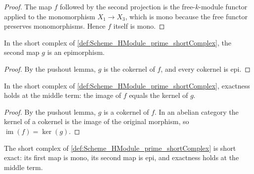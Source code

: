 \begin{proof}

  \leanok
  The map \(f\) followed by the second projection is the free-\(k\)-module functor applied to the monomorphism \(X_1 \to X_3\), which is mono because the free functor preserves monomorphisms. Hence \(f\) itself is mono.
\end{proof}

\begin{lemma}\leanok
  \label{lem:Scheme_HModule_prime_shortComplex_g_epi}

  In the short complex of \cref{def:Scheme_HModule_prime_shortComplex}, the second map \(g\) is an epimorphism.
\end{lemma}

\begin{proof}

  \leanok
  By the pushout lemma, \(g\) is the cokernel of \(f\), and every cokernel is epi.
\end{proof}

\begin{lemma}\leanok
  \label{lem:Scheme_HModule_prime_shortComplex_exact}

  In the short complex of \cref{def:Scheme_HModule_prime_shortComplex}, exactness holds at the middle term: the image of \(f\) equals the kernel of \(g\).
\end{lemma}

\begin{proof}

  \leanok
  By the pushout lemma, \(g\) is a cokernel of \(f\). In an abelian category the kernel of a cokernel is the image of the original morphism, so \(\operatorname{im}(f)=\ker(g)\).
\end{proof}

\begin{lemma}\leanok
  \label{lem:Scheme_HModule_prime_shortComplex_shortExact}

  The short complex of \cref{def:Scheme_HModule_prime_shortComplex} is short exact: its first map is mono, its second map is epi, and exactness holds at the middle term.
\end{lemma}

